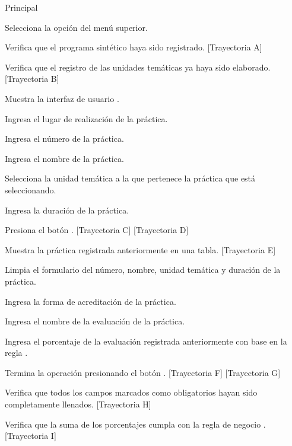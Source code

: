 \begin{UCtrayectoria}{Principal}

    \UCpaso[\UCactor] Selecciona la opción  del menú superior.
    
    \UCpaso Verifica que el programa sintético haya sido registrado. [Trayectoria A]
    
    \UCpaso Verifica que el registro de las unidades temáticas ya haya sido elaborado. [Trayectoria B]
    
    \UCpaso Muestra la interfaz de usuario .
    
    \UCpaso[\UCactor] Ingresa el lugar de realización de la práctica.
    
    \UCpaso[\UCactor] Ingresa el número de la práctica. 
    
    \UCpaso[\UCactor] Ingresa el nombre de la práctica.
    
    \UCpaso[\UCactor] Selecciona la unidad temática a la que pertenece la práctica que está seleccionando.
    
    \UCpaso[\UCactor] Ingresa la duración de la práctica.
    
    \UCpaso[\UCactor] Presiona el botón . [Trayectoria C] [Trayectoria D]
    
    \UCpaso Muestra la práctica registrada anteriormente en una tabla. [Trayectoria E]
    
    \UCpaso Limpia el formulario del número, nombre, unidad temática y duración de la práctica.
    
    \UCpaso[\UCactor] Ingresa la forma de acreditación de la práctica.
    
    \UCpaso[\UCactor] Ingresa el nombre de la evaluación de la práctica.
    
    \UCpaso[\UCactor] Ingresa el porcentaje de la evaluación registrada anteriormente con base en la regla .
    
    \UCpaso[\UCactor] Termina la operación presionando el botón . [Trayectoria F] [Trayectoria G]
    
    \UCpaso Verifica que todos los campos marcados como obligatorios hayan sido completamente llenados. [Trayectoria H]
    
    \UCpaso Verifica que la suma de los porcentajes cumpla con la regla de negocio . [Trayectoria I]
    

\end{UCtrayectoria}
